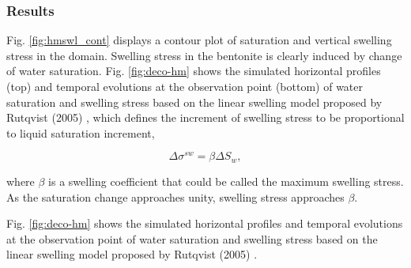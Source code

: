 \subsubsection*{Results}
Fig. \ref{fig:hmswl_cont} displays a contour plot of saturation and vertical swelling stress in the domain. Swelling stress in the bentonite is clearly induced by change of water saturation. Fig. \ref{fig:deco-hm} shows the simulated horizontal profiles (top) and temporal evolutions at the observation point (bottom) of water saturation and swelling stress based on the linear swelling model proposed by Rutqvist (2005) \cite{Jonny05}, which defines the increment of swelling stress to be proportional to liquid saturation increment,

\begin{equation}
\Delta \sigma ^{sw}=\beta \Delta S_w,
\end{equation}

where $\beta $ is a swelling coefficient that could be called the maximum swelling stress. As the saturation change approaches unity, swelling stress approaches $\beta $.

Fig. \ref{fig:deco-hm} shows the simulated horizontal profiles and temporal evolutions at the observation point of water saturation and swelling stress based on the linear swelling model proposed by Rutqvist (2005) \cite{Jonny05}.
